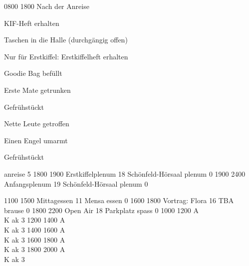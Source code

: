 \documentclass[a5paper,9pt]{scrreprt}
\newcommand{\cmark}{\ding{51}}%
\newcommand{\done}{\rlap{$\square$}{\raisebox{2pt}{\large\hspace{1pt}\cmark}}%
\hspace{-2.5pt}}
\begin{document}
\begin{center}
\begin{timetable}
   {0800} {1800} {Nach der Anreise}
  {\begin{todolist}[leftmargin=*]
    \item[\done] KIF-Heft erhalten
    \item Taschen in die Halle (durchgängig offen)
    \item Nur für Erstkiffel: Erstkiffelheft erhalten
    \item Goodie Bag befüllt
    \item Erste Mate getrunken
    \item Gefrühstückt
    \item Nette Leute getroffen
    \item Einen Engel umarmt
    \item Gefrühstückt
   \end{todolist}}
    {} {} {anreise}  {5}
   {1800} {1900} {Erstkiffelplenum} {18} {Schönfeld-Hörsaal} {} {plenum}  {0}
   {1900} {2400} {Anfangsplenum}    {19} {Schönfeld-Hörsaal} {} {plenum}  {0}

   {1100} {1500} {Mittagessen}      {11} {Mensa}        {} {essen}   {0}
   {1600} {1800} {Vortrag: Flora}   {16} {TBA}               {} {brause}  {0}
   {1800} {2200} {Open Air}         {18} {Parkplatz}         {} {spass}   {0}
   {1000} {1200} {\hfill A\\ \hfill K} {} {}               {} {ak}      {3}
   {1200} {1400} {\hfill A\\ \hfill K} {} {}               {} {ak}      {3}
   {1400} {1600} {\hfill A\\ \hfill K} {} {}               {} {ak}      {3}
   {1600} {1800} {\hfill A\\ \hfill K} {} {}               {} {ak}      {3}
   {1800} {2000} {\hfill A\\ \hfill K} {} {}               {} {ak}      {3}
  

\end{timetable}
\end{center}
\end{document}
